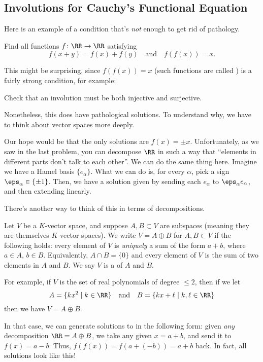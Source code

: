 \documentclass[11pt]{scrartcl}
\begin{document}
\subsection{Involutions for Cauchy's Functional Equation}
Here is an example of a condition that's \emph{not} enough to get rid of pathology.
\begin{example}
  \label{ex:invol}
  Find all functions $f \colon \RR \to \RR$  satisfying
  \[ f(x+y) = f(x)+f(y) \quad\text{and}\quad f(f(x)) = x. \]
\end{example}
This might be surprising, since $f(f(x)) = x$
(such functions are called )
is a fairly strong condition, for example:
\begin{exercise}
  Check that an involution must be both injective and surjective.
\end{exercise}
Nonetheless, this does have pathological solutions.
To understand why, we have to think about vector spaces more deeply.

Our hope would be that the only solutions are $f(x) = \pm x$.
Unfortunately, as we saw in the last problem, you can decompose $\RR$ in such a way that
``elements in different parts don't talk to each other''.
We can do the same thing here.
Imagine we have a Hamel basis $\{e_\alpha\}$.
What we can do is, for every $\alpha$, pick a sign $\eps_\alpha \in \{\pm1\}$.
Then, we have a solution given by sending each $e_\alpha$ to $\eps_\alpha e_\alpha$,
and then extending linearly.

There's another way to think of this in terms of decompositions.
\begin{definition}
  Let $V$ be a $K$-vector space, and suppose $A, B \subset V$ are subspaces
  (meaning they are themselves $K$-vector spaces).
  We write $V = A \oplus B$ for $A, B \subset V$ if the following holds:
  every element of $V$ is \emph{uniquely} a sum of the form $a + b$,
  where $a \in A$, $b \in B$.
  Equivalently, $A \cap B = \{0\}$ and every element of $V$ is the sum
  of two elements in $A$ and $B$.
  We say $V$ is a  of $A$ and $B$.
\end{definition}
For example, if $V$ is the set of real polynomials of degree $\le 2$,
then if we let
\[ A = \{ kx^2 \mid k \in \RR \} \quad\text{and}\quad B = \{ kx  + \ell \mid k,\ell \in \RR \} \]
then we have $V = A \oplus B$.

In that case, we can generate solutions to 
in the following form: given \emph{any} decomposition $\RR = A \oplus B$,
we take any given $x = a+b$, and send it to $f(x) = a-b$.
Thus, $f(f(x)) = f(a + (-b)) = a + b$ back.
In fact, all solutions look like this!
\end{document}
